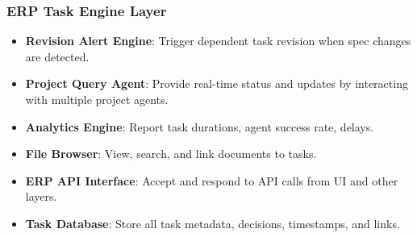 \begin{frame}
    \frametitle{ERP Task Engine Layer }
    \begin{itemize}
        \item \textbf{Revision Alert Engine}: Trigger dependent task revision when spec changes are detected.
        \item \textbf{Project Query Agent}: Provide real-time status and updates by interacting with multiple project agents.
        \item \textbf{Analytics Engine}: Report task durations, agent success rate, delays.
        \item \textbf{File Browser}: View, search, and link documents to tasks.
        \item \textbf{ERP API Interface}: Accept and respond to API calls from UI and other layers.
        \item \textbf{Task Database}: Store all task metadata, decisions, timestamps, and links.
    \end{itemize}
\end{frame}



